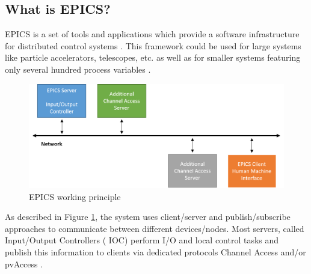 


\subsection{What is EPICS?} 
\label{EPICS}
EPICS is a set of tools and applications which provide a software infrastructure for distributed control systems \cite{EPICS_license}. This framework could be used for large systems like particle accelerators, telescopes, etc. as well as for smaller systems featuring only several hundred process variables \cite{EPICS_1, EPICS_2, EPICS_3, EPICS_4}.
\begin{figure}[!h]
\centering
\includegraphics[width=0.7\columnwidth]{Chapter3/Controls/images/EPICS.png}
\caption{EPICS working principle}
\label{fig_EPICS}
\end{figure}
As described in Figure \ref{fig_EPICS}, the system uses client/server and publish/subscribe approaches to communicate between different devices/nodes. Most servers, called Input/Output Controllers ( \gls{IOC}) perform I/O and local control tasks and publish this information to clients via dedicated protocols Channel Access and/or pvAccess \cite{EPICS}. 

